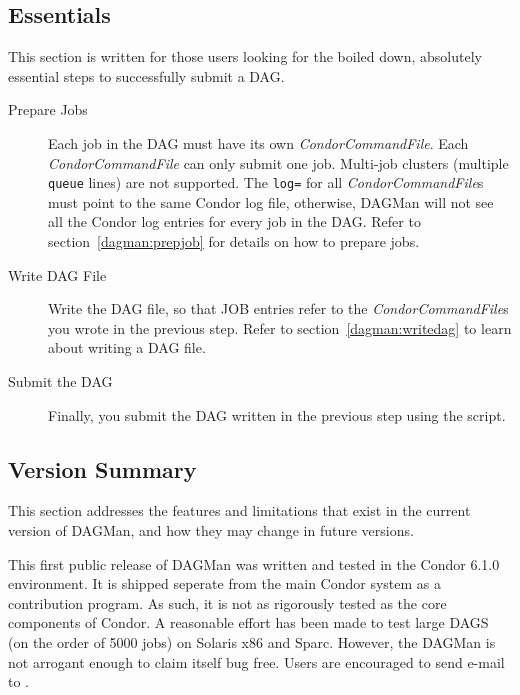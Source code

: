 \subsection{Essentials}
\label{dagman:essentials}

This section is written for those users looking for the boiled down,
absolutely essential steps to successfully submit a DAG.

\begin{description}

\item[Prepare Jobs] Each job in the DAG must have its own
\textit{CondorCommandFile}.  Each \textit{CondorCommandFile} can only submit
one job.  Multi-job clusters (multiple \texttt{queue} lines) are not
supported.  The \texttt{log=} for all \textit{CondorCommandFile}s must point
to the same Condor log file, otherwise, DAGMan will not see all the Condor log
entries for every job in the DAG.  Refer to section~\ref{dagman:prepjob} for
details on how to prepare jobs.

\item[Write DAG File] Write the DAG file, so that JOB entries refer to the
\textit{CondorCommandFile}s you wrote in the previous step.  Refer to
section~\ref{dagman:writedag} to learn about writing a DAG file.

\item[Submit the DAG] Finally, you submit the DAG written in the previous step
using the  script.

\end{description}


\subsection{Version Summary}
\label{dagman:version}

This section addresses the features and limitations that exist in the current
version of DAGMan, and how they may change in future versions.

This first public release of DAGMan was written and tested in the Condor 6.1.0
environment.  It is shipped seperate from the main Condor system as a
contribution program.  As such, it is not as rigorously tested as the core
components of Condor.  A reasonable effort has been made to test large DAGS
(on the order of 5000 jobs) on Solaris x86 and Sparc.  However, the DAGMan is
not arrogant enough to claim itself bug free.  Users are encouraged to send
e-mail to .

